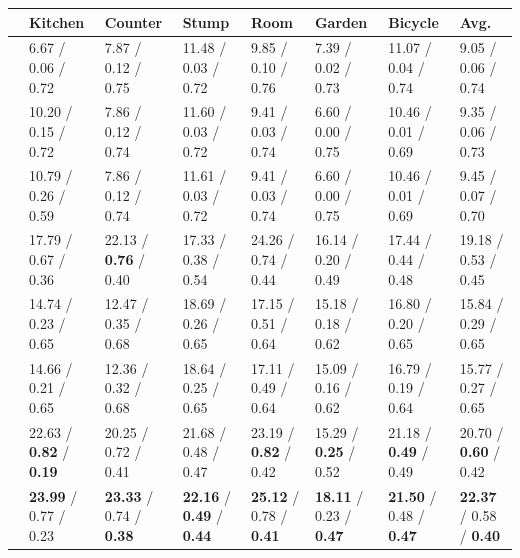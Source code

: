 \begin{table}[!ht]
   \scriptsize
   \centering
   \renewcommand{\arraystretch}{1.2} 
   \begin{tabular}{@{}P{0.23\textwidth}P{0.09 \textwidth}P{0.09 \textwidth}P{0.09 \textwidth}P{0.09 \textwidth}P{0.09 \textwidth}P{0.09 \textwidth}P{0.09 \textwidth}@{}}
   \toprule
    &
   Kitchen & Counter & Stump & Room & Garden & Bicycle & Avg.\\
   \midrule
    & 6.67 / 0.06 / 0.72 & 7.87 / 0.12 / 0.75 & 11.48 / 0.03 / 0.72 & 9.85 / 0.10 / 0.76 & 7.39 / 0.02 / 0.73 & 11.07 / 0.04 / 0.74 & 9.05 / 0.06 / 0.74 \\
    & 10.20 / 0.15 / 0.72 & 7.86 / 0.12 / 0.74 & 11.60 / 0.03 / 0.72 & 9.41 / 0.03 / 0.74 & 6.60 / 0.00 / 0.75 & 10.46 / 0.01 / 0.69 & 9.35 / 0.06 / 0.73 \\
    & 10.79 / 0.26 / 0.59 & 7.86 / 0.12 / 0.74 & 11.61 / 0.03 / 0.72 & 9.41 / 0.03 / 0.74 & 6.60 / 0.00 / 0.75 & 10.46 / 0.01 / 0.69 & 9.45 / 0.07 / 0.70 \\
    & 17.79 / 0.67 / 0.36 & 22.13 / \textbf{0.76} / 0.40 & 17.33 / 0.38 / 0.54 & 24.26 / 0.74 / 0.44 & 16.14 / 0.20 / 0.49 & 17.44 / 0.44 / 0.48 & 19.18 / 0.53 / 0.45 \\
    & 14.74 / 0.23 / 0.65 & 12.47 / 0.35 / 0.68 & 18.69 / 0.26 / 0.65 & 17.15 / 0.51 / 0.64 & 15.18 / 0.18 / 0.62 & 16.80 / 0.20 / 0.65 & 15.84 / 0.29 / 0.65 \\
    & 14.66 / 0.21 / 0.65 & 12.36 / 0.32 / 0.68 & 18.64 / 0.25 / 0.65 & 17.11 / 0.49 / 0.64 & 15.09 / 0.16 / 0.62 & 16.79 / 0.19 / 0.64 & 15.77 / 0.27 / 0.65 \\
   \midrule
    & 22.63 / \textbf{0.82} / \textbf{0.19} & 20.25 / 0.72 / 0.41 & 21.68 / 0.48 / 0.47 & 23.19 / \textbf{0.82} / 0.42 & 15.29 / \textbf{0.25} / 0.52 & 21.18 / \textbf{0.49} / 0.49 & 20.70 / \textbf{0.60} / 0.42 \\
    & \textbf{23.99} / 0.77 / 0.23 & \textbf{23.33} / 0.74 / \textbf{0.38} & \textbf{22.16} / \textbf{0.49} / \textbf{0.44} & \textbf{25.12} / 0.78 / \textbf{0.41} & \textbf{18.11} / 0.23 / \textbf{0.47} & \textbf{21.50} / 0.48 / \textbf{0.47} & \textbf{22.37} / 0.58 / \textbf{0.40} \\

\end{tabular}
\end{table}
